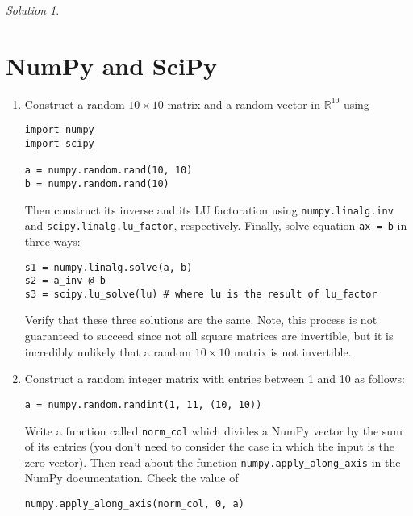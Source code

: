 \documentclass{article}
\newcommand{\R}{\mathbb R}
\theoremstyle{remark}
\newtheorem*{solution}{Solution}
\begin{document}
\medskip

\begin{solution}
\end{solution}

\pagebreak
\section{NumPy and SciPy}

\begin{enumerate}
\item
  Construct a random $10 \times 10$ matrix and a random vector in $\R^{10}$ using
  \begin{lstlisting}
import numpy
import scipy

a = numpy.random.rand(10, 10)
b = numpy.random.rand(10)\end{lstlisting}

  Then construct its inverse and its LU factoration using \texttt{numpy.linalg.inv} and \texttt{scipy.linalg.lu\_factor}, respectively.
  Finally, solve equation \texttt{ax = b} in three ways:
  \begin{lstlisting}
s1 = numpy.linalg.solve(a, b)
s2 = a_inv @ b
s3 = scipy.lu_solve(lu) # where lu is the result of lu_factor\end{lstlisting}
  Verify that these three solutions are the same.
  Note, this process is not guaranteed to succeed since not all square matrices are invertible, but it is incredibly unlikely that a random $10 \times 10$ matrix is not invertible.
\item
  Construct a random integer matrix with entries between 1 and 10 as follows:
  \begin{lstlisting}
a = numpy.random.randint(1, 11, (10, 10))\end{lstlisting}
  Write a function called \texttt{norm\_col} which divides a NumPy vector by the sum of its entries (you don't need to consider the case in which the input is the zero vector).
  Then read about the function \texttt{numpy.apply\_along\_axis} in the NumPy documentation.
  Check the value of
  \begin{lstlisting}
numpy.apply_along_axis(norm_col, 0, a)\end{lstlisting}
\end{enumerate}
\end{document}
